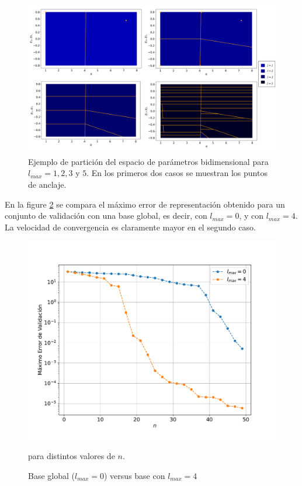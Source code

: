 \begin{figure}[h!]
\centering
\includegraphics[width=1\columnwidth]{figs/particion2d.png}
\caption{Ejemplo de partición del espacio de parámetros bidimensional para $l_{max}= 1, 2, 3$ y $5$. En los primeros dos casos se muestran los puntos de anclaje.}
\label{fig:part1}
\end{figure}


En la figure \ref{fig:l0vl4} se compara el máximo error de representación obtenido para un conjunto de validación con una base global, es decir, con $l_{max} = 0$, y con $l_{max}=4$. La velocidad de convergencia es claramente mayor en el segundo caso.

\begin{figure}[h!]
\centering
\includegraphics[width=.8\columnwidth, trim={0, 1.3cm, 0, 1.4cm}]{figs/l0vsl4.pdf}
\caption{Base global ($l_{max} = 0$) versus base con $l_{max} = 4$} para distintos valores de $n$.
\label{fig:l0vl4}
\end{figure}


